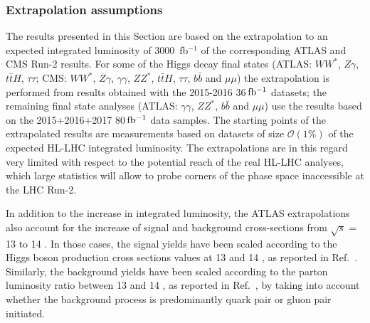 \subsubsection{Extrapolation assumptions}
\label{sec:HiggsExtrapAss}

The results presented in this Section are based on the extrapolation to an expected integrated luminosity of 3000~fb$^{-1}$ %
of the corresponding ATLAS and CMS Run-2 results. For some of the Higgs decay final states (ATLAS: $WW^*$, $Z\gamma$, $t\bar{t}H$, $\tau\tau$; CMS: $WW^*$, $Z\gamma$, $\gamma\gamma$, $ZZ^*$, $t\bar{t}H$, $\tau\tau$, $b\bar{b}$ and $\mu\mu$) the extrapolation is performed from results obtained with the 2015-2016 36\,$\mbox{fb$^{-1}$}$ datasets; the remaining final state analyses (ATLAS: $\gamma\gamma$, $ZZ^*$, $b\bar{b}$ and $\mu\mu$) use the results based on the 2015+2016+2017 80\,$\mbox{fb$^{-1}$}$ data samples. The starting points of the extrapolated results are measurements based on datasets of size $\mathcal{O}(1\%)$ of the expected HL-LHC integrated luminosity. The extrapolations are in this regard very limited with respect to the potential reach of the real HL-LHC analyses, which large statistics will allow to probe corners of the phase space inaccessible at the LHC Run-2.
    
In addition to the increase in integrated luminosity, the ATLAS extrapolations also account for the increase of signal and background cross-sections from $\sqrt{s}$ = 13 \UTeV to 14 \UTeV.  In those cases, the signal yields have been scaled according to the Higgs boson production cross sections values at 13 and 14 \UTeV, as reported in Ref.~\cite{deFlorian:2016spz}. Similarly, the background yields have been scaled according to the parton luminosity ratio between 13 and 14 \UTeV, as reported in Ref.~\cite{Heinemeyer:2013tqa}, by taking into account whether the background process is predominantly quark pair or gluon pair initiated.

